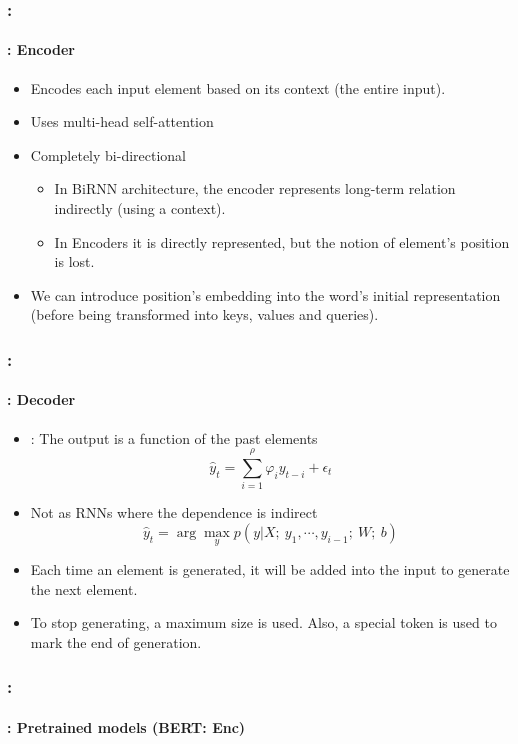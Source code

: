 \documentclass[xcolor=table]{beamer}
\begin{document}
\begin{frame}
	\frametitle{\insertshortsubtitle: \insertsection}
	\framesubtitle{\insertsubsection: Encoder}
	
	\begin{itemize}
		\item Encodes each input element based on its context (the entire input).
		\item Uses multi-head self-attention
		\item Completely bi-directional
		\begin{itemize}
			\item In BiRNN architecture, the encoder represents long-term relation indirectly (using a context).
			\item In Encoders it is directly represented, but the notion of element's position is lost.
		\end{itemize} 
		\item We can introduce position's embedding into the word's initial representation (before being transformed into keys, values and queries).
	\end{itemize}
	
\end{frame}

\begin{frame}
	\frametitle{\insertshortsubtitle: \insertsection}
	\framesubtitle{\insertsubsection: Decoder}
	
	\begin{itemize}
		\item {}: The output is a  function of the past elements
		\[\hat{y}_t = \sum_{i = 1}^{\rho} \varphi_{i} y_{t-i} + \epsilon_t\]
		\item Not as RNNs where the dependence is indirect
		\[\hat{y}_t = \arg\max_y p(y | X;\ y_1, \cdots, y_{i-1};\ W;\ b)\]
		\item Each time an element is generated, it will be added into the input to generate the next element.
		\item To stop generating, a maximum size is used. Also, a special token is used to mark the end of generation.
	\end{itemize}
	
\end{frame}

\begin{frame}
	\frametitle{\insertshortsubtitle: \insertsection}
	\framesubtitle{\insertsubsection: Pretrained models (BERT: Enc) \cite{devlin-etal-2019-bert}}

	\begin{center}
	\end{center}
	
\end{frame}
\end{document}

